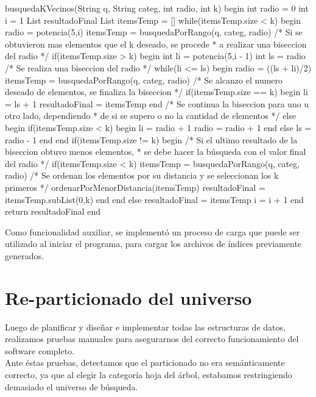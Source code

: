 \begin{algorithm}[caption={B\'usqueda de los k-vecinos}, label={alg5}]
busquedaKVecinos(String q, String categ, int radio, int k)
begin
 int radio = 0
 int i = 1
 List resultadoFinal
 List itemsTemp = []
 while(itemsTemp.size < k)
 begin
  radio = potencia(5,i)
  itemsTemp = busquedaPorRango(q, categ, radio)
  /* Si se obtuvieron mas elementos que el k deseado, se procede 
   * a realizar una biseccion del radio */
  if(itemsTemp.size > k)
  begin
   int li = potencia(5,i - 1)
   int ls = radio
   /* Se realiza una biseccion del radio */
   while(li <= ls)
   begin
    radio = ((ls + li)/2)
    itemsTemp = busquedaPorRango(q, categ, radio)
    /* Se alcanzo el numero deseado de elementos, se finaliza la biseccion */
    if(itemsTemp.size == k)
    begin
     li = ls + 1
     resultadoFinal = itemsTemp
    end
    /* Se continua la biseccion para uno u otro lado, dependiendo 
     * de si se supero o no la cantidad de elementos */
    else
    begin
     if(itemsTemp.size < k)
     begin
      li = radio + 1
      radio = radio + 1
     end
     else
      ls = radio - 1
    end
   end
   if(itemsTemp.size != k)
   begin
    /* Si el ultimo resultado de la biseccion obtuvo menos elementos,
     * se debe hacer la b\'usqueda con el valor final del radio */
    if(itemsTemp.size < k)
     itemsTemp = busquedaPorRango(q, categ, radio)
    /* Se ordenan los elementos por su distancia y se seleccionan los k primeros */
    ordenarPorMenorDistancia(itemsTemp)
    resultadoFinal = itemsTemp.subList(0,k)
   end
  end
  else
   resultadoFinal = itemsTemp
  i = i + 1 
 end
 return resultadoFinal
end
\end{algorithm}

Como funcionalidad auxiliar, se implement\'o un proceso de carga que puede ser utilizado al iniciar el programa, para cargar los archivos de \'indices previamente generados.


\section{Re-particionado del universo}

Luego de planificar y diseñar e implementar todas las estructuras de datos, realizamos pruebas manuales para asegurarnos del correcto funcionamiento del software completo.\\

Ante \'estas pruebas, detectamos que el particionado no era sem\'anticamente correcto, ya que al elegir la categor\'ia hoja del \'arbol, estabamos restringiendo demasiado el universo de b\'usqueda.\\

